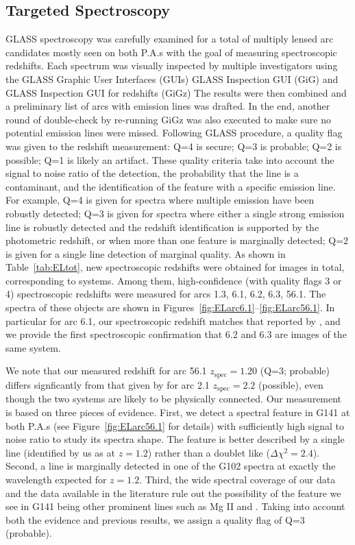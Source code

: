 \subsection{Targeted \glass Spectroscopy}
\label{subsec:targeted}

GLASS spectroscopy was carefully examined for a total of \NimgTOT{}
multiply lensed arc candidates mostly seen on both P.A.s with the goal
of measuring spectroscopic redshifts.
Each spectrum was visually inspected by multiple investigators
using the GLASS Graphic User Interfaces (GUIs) GLASS
Inspection GUI (GiG) and GLASS Inspection GUI for redshifts (GiGz) The
results were then combined and a preliminary list of arcs with
emission lines was drafted. In the end, another round of double-check
by re-running GiGz was also executed to make sure no potential
emission lines were missed. Following GLASS procedure, a quality flag
was given to the redshift measurement: Q=4 is secure; Q=3 is probable;
Q=2 is possible; Q=1 is likely an artifact.
These quality criteria take into account the signal to noise ratio of
the detection, the probability that the line is a contaminant, and the
identification of the feature with a specific emission line. For
example, Q=4 is given for spectra where multiple emission have been
robustly detected; Q=3 is given for spectra where either a single
strong emission line is robustly detected and the redshift
identification is supported by the photometric redshift, or when more
than one feature is marginally detected; Q=2 is given for a single
line detection of marginal quality. As shown in Table~\ref{tab:ELtot},
new spectroscopic redshifts were obtained for \NimgELtot{} images in
total, corresponding to \NsysELtot{} systems. Among them, \NimgELhiQ{}
high-confidence (with quality flags 3 or 4) spectroscopic redshifts
were measured for arcs 1.3, 6.1, 6.2, 6.3, 56.1. The spectra of these
objects are shown in
Figures~\ref{fig:ELarc6.1}--\ref{fig:ELarc56.1}. In particular for arc
6.1, our spectroscopic redshift matches that reported by
\citet{2014MNRAS.444..268R}, and we provide the first spectroscopic
confirmation that 6.2 and 6.3 are images of the same system.

We note that our measured redshift for arc 56.1 $z_{\textrm{spec}}=1.20$ (Q=3; probable) differs signficantly
from that given by \citet{Johnson:2014p37801} for arc 2.1 $z_{\textrm{spec}}=2.2$ (possible), even though the two
systems are likely to be physically connected.  Our measurement is based on three pieces of evidence. First, we
detect a spectral feature in G141 at both P.A.s (see Figure~\ref{fig:ELarc56.1} for details) with sufficiently
high signal to noise ratio to study its spectra shape. The feature is better described by a single line
(identified by us as \Ha at $z=1.2$) rather than a doublet like \OIII ($\Delta \chi^2=2.4$). Second, a
line is marginally detected in one of the G102 spectra at exactly the wavelength expected for \OIII $z=1.2$.
Third, the wide spectral coverage of our data and the data available in the literature rule out the possibility
of the feature we see in G141 being other prominent lines such as Mg II and \OII. Taking into account both the
evidence and previous results, we assign a quality flag of Q=3 (probable).

